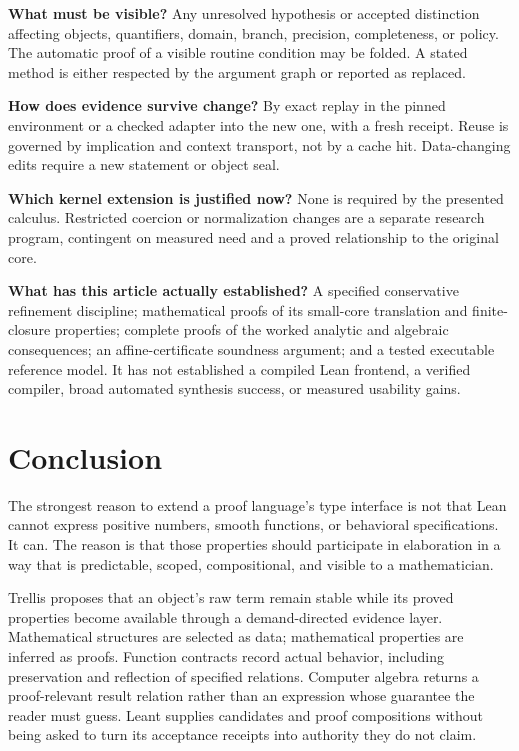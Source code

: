 \documentclass[11pt,a4paper]{article}
\theoremstyle{definition}
\theoremstyle{remark}
\begin{document}
\textbf{What must be visible?} Any unresolved hypothesis or accepted distinction affecting objects, quantifiers, domain, branch, precision, completeness, or policy. The automatic proof of a visible routine condition may be folded. A stated method is either respected by the argument graph or reported as replaced.

\textbf{How does evidence survive change?} By exact replay in the pinned environment or a checked adapter into the new one, with a fresh receipt. Reuse is governed by implication and context transport, not by a cache hit. Data-changing edits require a new statement or object seal.

\textbf{Which kernel extension is justified now?} None is required by the presented calculus. Restricted coercion or normalization changes are a separate research program, contingent on measured need and a proved relationship to the original core.

\textbf{What has this article actually established?} A specified conservative refinement discipline; mathematical proofs of its small-core translation and finite-closure properties; complete proofs of the worked analytic and algebraic consequences; an affine-certificate soundness argument; and a tested executable reference model. It has not established a compiled Lean frontend, a verified compiler, broad automated synthesis success, or measured usability gains.

\section{Conclusion}

The strongest reason to extend a proof language's type interface is not that Lean cannot express positive numbers, smooth functions, or behavioral specifications. It can. The reason is that those properties should participate in elaboration in a way that is predictable, scoped, compositional, and visible to a mathematician.

Trellis proposes that an object's raw term remain stable while its proved properties become available through a demand-directed evidence layer. Mathematical structures are selected as data; mathematical properties are inferred as proofs. Function contracts record actual behavior, including preservation and reflection of specified relations. Computer algebra returns a proof-relevant result relation rather than an expression whose guarantee the reader must guess. Leant supplies candidates and proof compositions without being asked to turn its acceptance receipts into authority they do not claim.
\end{document}
